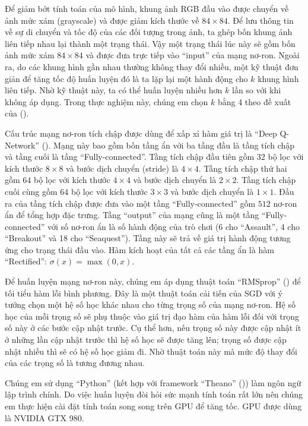 	Để giảm bớt tính toán của mô hình, khung ảnh RGB đầu vào được chuyển về ảnh mức xám (grayscale) và được giảm kích thước về $84\times84$.
	Để lưu thông tin về sự di chuyển và tốc độ của các đối tượng trong ảnh, ta ghép bốn khung ảnh liên tiếp nhau lại thành một trạng thái.
	Vậy một trạng thái lúc này sẽ gồm bốn ảnh mức xám $84\times84$ và được đưa trực tiếp vào ``input'' của mạng nơ-ron.
	Ngoài ra, do các khung hình gần nhau thường không thay đổi nhiều, một kỹ thuật đơn giản để tăng tốc độ huấn luyện đó là ta lặp lại một hành động cho $k$ khung hình liên tiếp.
	Nhờ kỹ thuật này, ta có thể huấn luyện nhiều hơn $k$ lần so với khi không áp dụng.
	Trong thực nghiệm này, chúng em chọn $k$ bằng 4 theo đề xuất của (\cite{mnih2013playing}).
	
	Cấu trúc mạng nơ-ron tích chập được dùng để xấp xỉ hàm giá trị là ``Deep Q-Network'' (\cite{mnihdqn2015}).
	Mạng này bao gồm bốn tầng ẩn với ba tầng đầu là tầng tích chập và tầng cuối là tầng ``Fully-connected''.
	Tầng tích chập đầu tiên gồm $32$ bộ lọc với kích thước $8\times8$ và bước dịch chuyển (stride) là $4\times4$.
	Tầng tích chập thứ hai gồm $64$ bộ lọc với kích thước $4\times4$ và bước dịch chuyển là $2\times2$.
	Tầng tích chập cuối cùng gồm $64$ bộ lọc với kích thước $3\times3$ và bước dịch chuyển là $1\times1$.
	Đầu ra của tầng tích chập được đưa vào một tầng ``Fully-connected'' gồm $512$ nơ-ron ẩn để tổng hợp đặc trưng.
	Tầng ``output'' của mạng cũng là một tầng ``Fully-connected'' với số nơ-ron ẩn là số hành động của trò chơi (6 cho ``Assault'', 4 cho ``Breakout'' và 18 cho ``Seaquest'').
	Tầng này sẽ trả về giá trị hành động tương ứng cho trạng thái đầu vào.
	Hàm kích hoạt của tất cả các tầng ẩn là hàm ``Rectified'': $\sigma(x) = \max(0, x)$.
	
	Để huấn luyện mạng nơ-ron này, chúng em áp dụng thuật toán ``RMSprop'' (\cite{tieleman2012lecture}) để tối tiểu hàm lỗi bình phương.
	Đây là một thuật toán cải tiến của SGD với ý tưởng chọn một hệ số học khác nhau cho từng trọng số của mạng nơ-ron.
	Hệ số học của mỗi trọng số sẽ phụ thuộc vào giá trị đạo hàm của hàm lỗi đối với trọng số này ở các bước cập nhật trước.
	Cụ thể hơn, nếu trọng số này được cập nhật ít ở những lần cập nhật trước thì hệ số học sẽ được tăng lên; trọng số được cập nhật nhiều thì sẽ có hệ số học giảm đi.
	Nhờ thuật toán này mà mức độ thay đổi của các trọng số là tương đương nhau.
	
	Chúng em sử dụng ``Python'' (kết hợp với framework ``Theano'' (\cite{2016arXiv160502688short})) làm ngôn ngữ lập trình chính.
	Do việc huấn luyện đòi hỏi sức mạnh tính toán rất lớn nên chúng em thực hiện cài đặt tính toán song song trên GPU để tăng tốc.
	GPU được dùng là NVIDIA GTX 980.
	
